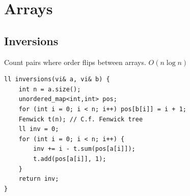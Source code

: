 \documentclass[10pt,a4paper]{article}
\begin{document}
\section{Arrays}

\subsection{Inversions}

Count pairs where order flips between arrays. $O(n \log n)$
\begin{verbatim}
ll inversions(vi& a, vi& b) {
    int n = a.size();
    unordered_map<int,int> pos;
    for (int i = 0; i < n; i++) pos[b[i]] = i + 1;
    Fenwick t(n); // C.f. Fenwick tree
    ll inv = 0;
    for (int i = 0; i < n; i++) {
        inv += i - t.sum(pos[a[i]]);
        t.add(pos[a[i]], 1);
    }
    return inv;
}
\end{verbatim}
\end{document}
